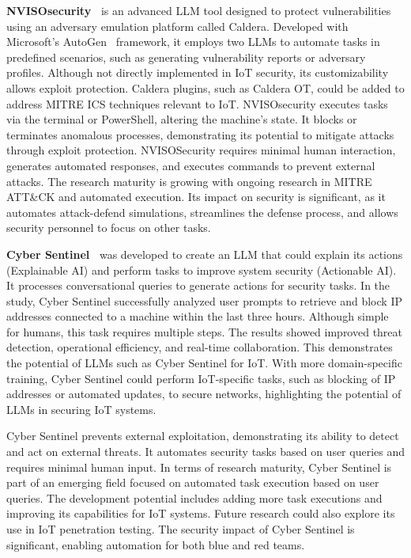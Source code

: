 \smallskip
\noindent \textbf{NVISOsecurity~\citet{Raman_2024}} is an advanced LLM tool designed to protect vulnerabilities using an adversary emulation platform called Caldera.
Developed with Microsoft's AutoGen~\citet{wu2023autogen} framework, it employs two LLMs to automate tasks in predefined scenarios, such as generating vulnerability reports or adversary profiles.
Although not directly implemented in IoT security, its customizability allows exploit protection.
Caldera plugins, such as Caldera OT, could be added to address MITRE ICS techniques relevant to IoT.
NVISOsecurity executes tasks via the terminal or PowerShell, altering the machine's state.
It blocks or terminates anomalous processes, demonstrating its potential to mitigate attacks through exploit protection.
NVISOSecurity requires minimal human interaction, generates automated responses, and executes commands to prevent external attacks.
The research maturity is growing with ongoing research in MITRE ATT\&CK and automated execution.
Its impact on security is significant, as it automates attack-defend simulations, streamlines the defense process, and allows security personnel to focus on other tasks.

\smallskip
\noindent \textbf{Cyber Sentinel~\citet{kaheh2023cyber}} was developed to create an LLM that could explain its actions (Explainable AI) and perform tasks to improve system security (Actionable AI).
It processes conversational queries to generate actions for security tasks.
In the study, Cyber Sentinel successfully analyzed user prompts to retrieve and block IP addresses connected to a machine within the last three hours.
Although simple for humans, this task requires multiple steps.
The results showed improved threat detection, operational efficiency, and real-time collaboration.
This demonstrates the potential of LLMs such as Cyber Sentinel for IoT.
With more domain-specific training, Cyber Sentinel could perform IoT-specific tasks, such as blocking of IP addresses or automated updates, to secure networks, highlighting the potential of LLMs in securing IoT systems.

Cyber Sentinel prevents external exploitation, demonstrating its ability to detect and act on external threats.
It automates security tasks based on user queries and requires minimal human input.
In terms of research maturity, Cyber Sentinel is part of an emerging field focused on automated task execution based on user queries.
The development potential includes adding more task executions and improving its capabilities for IoT systems.
Future research could also explore its use in IoT penetration testing.
The security impact of Cyber Sentinel is significant, enabling automation for both blue and red teams.
%
